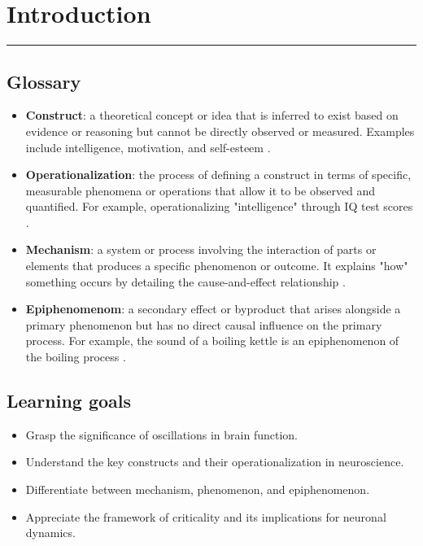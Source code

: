 \chapter{Introduction}

\rule{\linewidth}{0.4pt} %

\section*{Glossary}

\vspace{3pt}           %
\begin{itemize}
    \item \textbf{Construct}: a theoretical concept or idea that is inferred to exist based on evidence or reasoning but cannot be directly observed or measured. Examples include intelligence, motivation, and self-esteem \cite{construct_philosophy}.
    \item \textbf{Operationalization}: the process of defining a construct in terms of specific, measurable phenomena or operations that allow it to be observed and quantified. For example, operationalizing "intelligence" through IQ test scores \cite{operationalization}.
    \item \textbf{Mechanism}: a system or process involving the interaction of parts or elements that produces a specific phenomenon or outcome. It explains "how" something occurs by detailing the cause-and-effect relationship \cite{mechanism_philosophy}.
    \item \textbf{Epiphenomenom}:  a secondary effect or byproduct that arises alongside a primary phenomenon but has no direct causal influence on the primary process. For example, the sound of a boiling kettle is an epiphenomenon of the boiling process \cite{epiphenomenon}.
\end{itemize}


\section*{Learning goals}

\begin{itemize}
\item Grasp the significance of oscillations in brain function.
\item Understand the key constructs and their operationalization in neuroscience.
\item Differentiate between mechanism, phenomenon, and epiphenomenon.
\item Appreciate the framework of criticality and its implications for neuronal dynamics.
\end{itemize}


